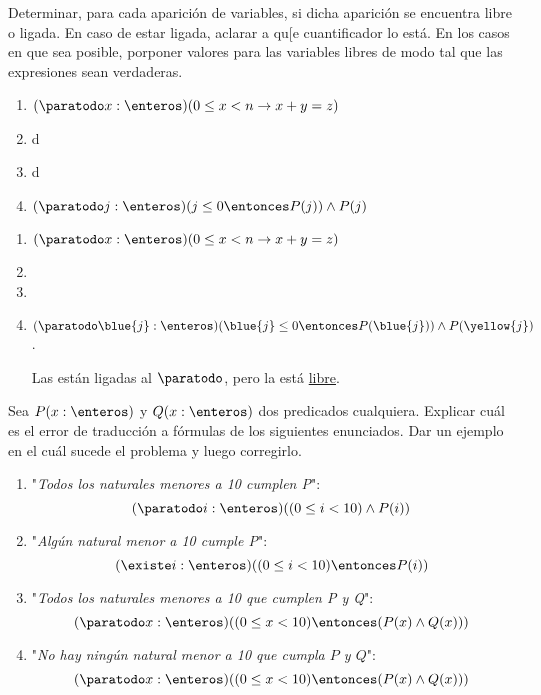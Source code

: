 \begin{enunciado}{\ejercicio}
  Determinar, para cada aparición de variables, si dicha aparición se encuentra libre o ligada. En caso de estar ligada,
  aclarar a qu[e cuantificador lo está. En los casos en que sea posible, porponer valores para las variables libres de modo
  tal que las expresiones sean verdaderas.

  \begin{enumerate}[label=\alph*)]
    \item $(\paratodo x: \enteros)(0 \leq x < n \to x+y =z)$
    \item d
    \item d
    \item $(\paratodo j: \enteros)(j \leq 0 \entonces P(j) ) \land P(j)$
  \end{enumerate}

\end{enunciado}

\begin{enumerate}[label=\alph*)]
  \item $(\paratodo x: \enteros)(0 \leq x < n \to x+y =z)$
  \item
  \item
  \item $(\paratodo \blue{j}: \enteros)(\blue{j} \leq 0 \entonces P(\blue{j}) ) \land P(\yellow{j})$.\par

        Las  están ligadas al $\paratodo$, pero la  está
        \href{https://youtu.be/7812dngARbk?t=43}{libre}.
\end{enumerate}

\begin{enunciado}{\ejercicio}
  Sea $P(x: \enteros)$ y $Q(x: \enteros)$ dos predicados cualquiera. Explicar cuál es el error de traducción a
  fórmulas de los siguientes enunciados. Dar un ejemplo en el cuál sucede el problema y luego corregirlo.
  \begin{enumerate}[label=\alph*)]
    \item "\textit{Todos los naturales menores a 10 cumplen P}":
          $$
            (\paratodo i : \enteros)((0 \leq i < 10) \land P(i))
          $$

    \item "\textit{Algún natural menor a 10 cumple P}":
          $$
            (\existe i : \enteros)((0 \leq i < 10) \entonces P(i))
          $$

    \item "\textit{Todos los naturales menores a 10 que cumplen P y Q}":
          $$
            (\paratodo x : \enteros)((0 \leq x < 10) \entonces (P(x) \land Q(x)))
          $$

    \item "\textit{No hay ningún natural menor a 10 que cumpla $P$ y $Q$}":
          $$
            (\paratodo x : \enteros)((0 \leq x < 10) \entonces (P(x) \land Q(x)))
          $$
  \end{enumerate}
\end{enunciado}

